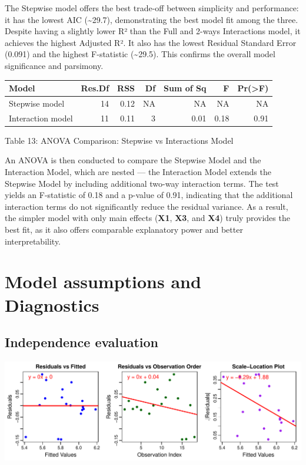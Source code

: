 \documentclass[
  12pt,
]{article}
\begin{document}
The Stepwise model offers the best trade-off between simplicity and
performance: it has the lowest AIC (\textasciitilde29.7), demonstrating
the best model fit among the three. Despite having a slightly lower R²
than the Full and 2-ways Interactions model, it achieves the highest
Adjusted R². It also has the lowest Residual Standard Error (0.091) and
the highest F-statistic (\textasciitilde29.5). This confirms the overall
model significance and parsimony.

\begin{table}[!h]
\centering\begingroup\fontsize{8}{10}\selectfont

\begin{tabular}{lrrrrrr}
\toprule
Model & Res.Df & RSS & Df & Sum of Sq & F & Pr(>F)\\
\midrule
Stepwise model & 14 & 0.12 & NA & NA & NA & NA\\
Interaction model & 11 & 0.11 & 3 & 0.01 & 0.18 & 0.91\\
\bottomrule
\end{tabular}
\endgroup{}
\end{table}
\begin{center}
{\fontsize{12}{14}\selectfont Table 13: ANOVA Comparison: Stepwise vs Interactions Model\par}
\end{center}

An ANOVA is then conducted to compare the Stepwise Model and the
Interaction Model, which are nested --- the Interaction Model extends
the Stepwise Model by including additional two-way interaction terms.
The test yields an F-statistic of 0.18 and a p-value of 0.91, indicating
that the additional interaction terms do not significantly reduce the
residual variance. As a result, the simpler model with only main effects
(\textbf{X1}, \textbf{X3}, and \textbf{X4}) truly provides the best fit,
as it also offers comparable explanatory power and better
interpretability.

\section{Model assumptions and
Diagnostics}\label{model-assumptions-and-diagnostics}

\subsection{Independence evaluation}\label{independence-evaluation}

\includegraphics{report1_r1_files/figure-latex/unnamed-chunk-11-1.pdf}
\end{document}
